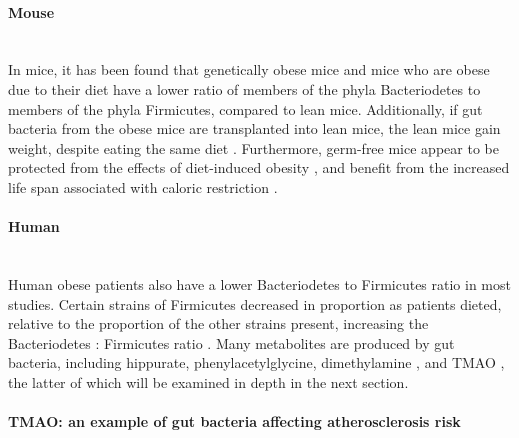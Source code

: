 \paragraph{Mouse}\mbox{}\\
In mice, it has been found that genetically obese mice \cite{turnbaugh2006obesity} and mice who are obese due to their diet \cite{turnbaugh2008diet} have a lower ratio of members of the phyla Bacteriodetes to members of the phyla Firmicutes, compared to lean mice. Additionally, if gut bacteria from the obese mice are transplanted into lean mice, the lean mice gain weight, despite eating the same diet \cite{turnbaugh2006obesity}. Furthermore, germ-free mice appear to be protected from the effects of diet-induced obesity \cite{backhed2007mechanisms}, and benefit from the increased life span associated with caloric restriction \cite{gordon1966aging}.

\paragraph{Human}\mbox{}\\
Human obese patients also have a lower Bacteriodetes to Firmicutes ratio \cite{turnbaugh2006obesity} in most studies. Certain strains of Firmicutes decreased in proportion as patients dieted, relative to the proportion of the other strains present, increasing the Bacteriodetes : Firmicutes ratio \cite{duncan2008human}. Many metabolites are produced by gut bacteria, including hippurate, phenylacetylglycine, dimethylamine \cite{yap2008metabonomic}, and TMAO \cite{tang2013intestinal}, the latter of which will be examined in depth in the next section.

\paragraph{TMAO: an example of gut bacteria affecting atherosclerosis risk}\mbox{}\\

